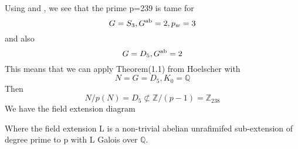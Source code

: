\documentclass[preprint,12pt]{elsarticle}
\begin{document}
Using \cite{HOEL} and \cite{JONE}, we see that 
the prime p=239 is tame for \[G=S_3,G\textsuperscript{ab} = 2, p_w =3  \] and also 
\newline
\[G=D_5,G\textsuperscript{ab} = 2 \]
This means that we can apply Theorem(1.1) from Hoelscher with \[N = G = D_5, K_0 = \mathbb{Q}\]
\newline
Then \[N/p(N) = D_5 \not\subset \mathbb{Z}/(p-1) = \mathbb{Z}_{238}\]
\newline
We have the field extension diagram
\bigskip
\newline
\begin{center}
    
\end{center}
\newline
Where the field extension L is a non-trivial abelian unrafimifed sub-extension of degree prime to p with L Galois over $\mathbb{Q}$.
\end{document}
